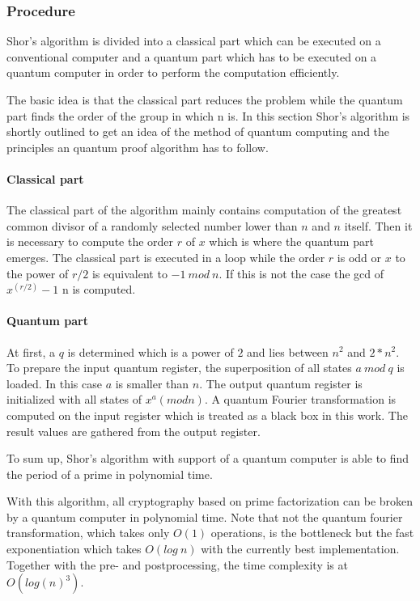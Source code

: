 \subsubsection*{Procedure}
Shor's algorithm is divided into a classical part which can be executed on a conventional computer and a quantum part which has to be executed on a quantum computer in order to perform the computation efficiently. 

The basic idea is that the classical part reduces the problem while the quantum part finds the order of the group in which n is. 
In this section Shor's algorithm is shortly outlined to get an idea of the method of quantum computing and the principles an quantum proof algorithm has to follow. 
\paragraph{Classical part}
The classical part of the algorithm mainly contains computation of the greatest common divisor of a randomly selected number lower than $n$ and $n$ itself. Then it is necessary to compute the order $r$ of $x$ which is where the quantum part emerges. The classical part is executed in a loop while the order $r$ is odd or $x$ to the power of $r/2$ is equivalent to $-1\: mod\:n$.  %
If this is not the case the gcd of $x^{(r / 2)} -1$ n is computed.
\paragraph{Quantum part}
At first, a $q$ is determined which is a power of $2$ and lies between $n^2$ and $2*n^2$. 
To prepare the input quantum register, the superposition of all states $a\: mod\: q$ is loaded. In this case $a$ is smaller than $n$.
The output quantum register is initialized with all states of $x^a(mod n)$. 
A quantum Fourier transformation is computed on the input register which is treated as a black box in this work. 
The result values are gathered from the output register. 

To sum up, Shor's algorithm with support of a quantum computer is able to find the period of a prime in polynomial time. 

With this algorithm, all cryptography based on prime factorization can be broken by a quantum computer in polynomial time. Note that not the quantum fourier transformation, which takes only $O(1)$ operations, is the bottleneck but  the fast exponentiation which takes $O(log\: n)$ with the currently best implementation\cite{markov2012constant}. Together with the pre- and  postprocessing, the time complexity is at $O(log(n)^3)$.

